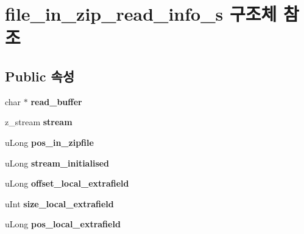 \hypertarget{structfile__in__zip__read__info__s}{}\section{file\+\_\+in\+\_\+zip\+\_\+read\+\_\+info\+\_\+s 구조체 참조}
\label{structfile__in__zip__read__info__s}
\subsection*{Public 속성}
\begin{DoxyCompactItemize}
\item 
\mbox{\label{structfile__in__zip__read__info__s_a6310a19e33ac2cf3280aa74199cbd89b}} 
char $\ast$ {\bfseries read\+\_\+buffer}
\item 
\mbox{\label{structfile__in__zip__read__info__s_a6973c6240c02a1c8e014d6078bb2bbfc}} 
z\+\_\+stream {\bfseries stream}
\item 
\mbox{\label{structfile__in__zip__read__info__s_a01d6195d7977bec4db506cdbee9b8a13}} 
u\+Long {\bfseries pos\+\_\+in\+\_\+zipfile}
\item 
\mbox{\label{structfile__in__zip__read__info__s_a8f2d03c24a7b1058288606687eb6d448}} 
u\+Long {\bfseries stream\+\_\+initialised}
\item 
\mbox{\label{structfile__in__zip__read__info__s_a8e3a240c367e7d6d199859b1b311128c}} 
u\+Long {\bfseries offset\+\_\+local\+\_\+extrafield}
\item 
\mbox{\label{structfile__in__zip__read__info__s_a9abdc9b3f3d500d894a635cc9e956180}} 
u\+Int {\bfseries size\+\_\+local\+\_\+extrafield}
\item 
\mbox{\label{structfile__in__zip__read__info__s_aa07cf3d7d5d68e9537ffe99499d7db6f}} 
u\+Long {\bfseries pos\+\_\+local\+\_\+extrafield}
\item 
\mbox{\label{structfile__in__zip__read__info__s_a9d7e4dc6f312fb59bf8e60fb952f4d68}} 

\end{DoxyCompactItemize}
